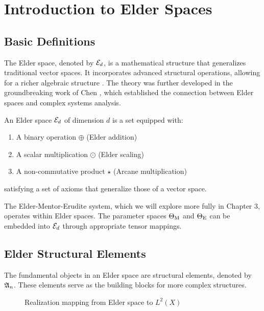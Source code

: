 \chapter{Introduction to Elder Spaces}

\section{Basic Definitions}

The Elder space, denoted by $\mathcal{E}_{d}$, is a mathematical structure that generalizes traditional vector spaces. It incorporates advanced structural operations, allowing for a richer algebraic structure \cite{elder1995foundations}. The theory was further developed in the groundbreaking work of Chen \cite{chen2005realization}, which established the connection between Elder spaces and complex systems analysis.

\begin{definition}
An Elder space $\mathcal{E}_{d}$ of dimension $d$ is a set equipped with:
\begin{enumerate}
    \item A binary operation $\oplus$ (Elder addition)
    \item A scalar multiplication $\odot$ (Elder scaling)
    \item A non-commutative product $\star$ (Arcane multiplication)
\end{enumerate}
satisfying a set of axioms that generalize those of a vector space.
\end{definition}

\begin{remark}
The Elder-Mentor-Erudite system, which we will explore more fully in Chapter 3, operates within Elder spaces. The parameter spaces $\Theta_{\text{M}}$ and $\Theta_{\text{E}}$ can be embedded into $\mathcal{E}_{d}$ through appropriate tensor mappings.
\end{remark}

\section{Elder Structural Elements}

The fundamental objects in an Elder space are structural elements, denoted by $\mathfrak{A}_{n}$. These elements serve as the building blocks for more complex structures.

\begin{figure}[htbp]
\centering
{}
\caption{Realization mapping from Elder space to $L^2(X)$}
\label{fig:realization-mapping}
\end{figure}

